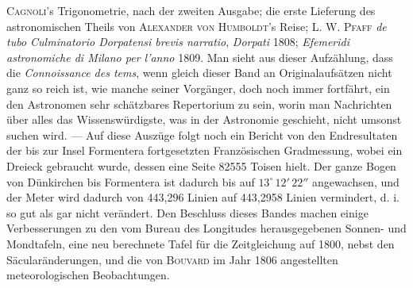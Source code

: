 \textsc{Cagnoli}'s Trigonometrie, nach der zweiten Ausgabe; die erste Lieferung des astronomischen Theils von \textsc{Alexander von Humboldt}'s Reise; \textsc{L. W. Pfaff} \emph{de tubo Culminatorio Dorpatensi brevis narratio}, \emph{Dorpati} 1808; \emph{Efemeridi astronomiche di Milano per l'anno} 1809. Man sieht aus dieser Aufzählung, dass die \emph{Connoissance des tems}, wenn gleich dieser Band an Originalaufsätzen nicht ganz so reich ist, wie manche seiner Vorgänger, doch noch immer fortfährt, ein den Astronomen sehr schätzbares Repertorium zu sein, worin man Nachrichten über alles das Wissenswürdigste, was in der Astronomie geschieht, nicht umsonst suchen wird. — Auf diese Auszüge folgt noch ein Bericht von den Endresultaten der bis zur Insel Formentera fortgesetzten Französischen Gradmessung, wobei ein Dreieck gebraucht wurde, dessen eine Seite 82555 Toisen hielt. Der ganze Bogen von Dünkirchen bis Formentera ist dadurch bis auf $13^\circ\,12'\,22''$ angewachsen, und der Meter wird dadurch von 443,296 Linien auf 443,2958 Linien vermindert, d. i. so gut als gar nicht verändert. Den Beschluss dieses Bandes machen einige Verbesserungen zu den vom Bureau des Longitudes herausgegebenen Sonnen- und Mondtafeln, eine neu berechnete Tafel für die Zeitgleichung auf 1800, nebst den Säcularänderungen, und die von \textsc{Bouvard} im Jahr 1806 angestellten meteorologischen Beobachtungen.
